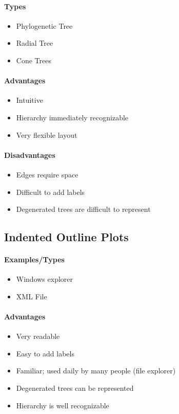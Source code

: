 \documentclass[10pt,a4paper]{article}
\begin{document}
		\paragraph{Types}
		\begin{itemize}
			\item Phylogenetic Tree
			\item Radial Tree
			\item Cone Trees
		\end{itemize}
		\paragraph{Advantages}
		\begin{itemize}
			\item Intuitive
			\item Hierarchy immediately recognizable
			\item Very flexible layout
		\end{itemize}
		\paragraph{Disadvantages}
		\begin{itemize}
			\item Edges require space
			\item Difficult to add labels
			\item Degenerated trees are difficult to represent
		\end{itemize}
	
	\subsection{Indented Outline Plots}
		\paragraph{Examples/Types}
		\begin{itemize}
			\item Windows explorer
			\item XML File 
		\end{itemize}
		\paragraph{Advantages}
		\begin{itemize}
			\item Very readable
			\item Easy to add labels
			\item Familiar; used daily by many people (file explorer)
			\item Degenerated trees can be represented
			\item Hierarchy is well recognizable
		\end{itemize}
\end{document}
